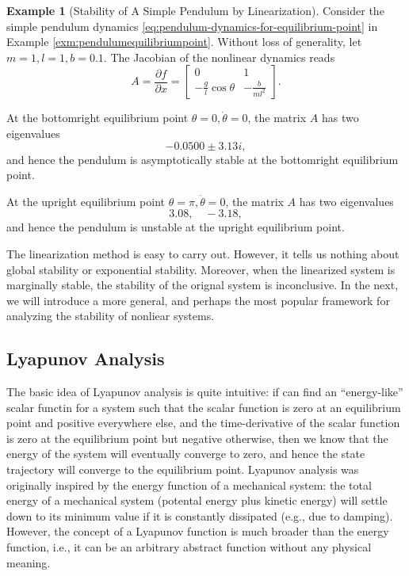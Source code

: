 \documentclass[
]{book}
\theoremstyle{definition}
\theoremstyle{definition}
\newtheorem{example}{Example}[chapter]
\theoremstyle{definition}
\theoremstyle{definition}
\theoremstyle{remark}
\begin{document}
\begin{example}[Stability of A Simple Pendulum by Linearization]
\protect\hypertarget{exm:pendulumstabilitybylinearization}{}\label{exm:pendulumstabilitybylinearization}Consider the simple pendulum dynamics \eqref{eq:pendulum-dynamics-for-equilibrium-point} in Example \ref{exm:pendulumequilibriumpoint}. Without loss of generality, let \(m=1,l=1,b=0.1\). The Jacobian of the nonlinear dynamics reads
\[
A = \frac{\partial f}{\partial x} = 
\begin{bmatrix}
0 & 1 \\
-\frac{g}{l} \cos \theta & -\frac{b}{ml^2}
\end{bmatrix}.
\]

At the bottomright equilibrium point \(\theta =0, \dot{\theta} = 0\), the matrix \(A\) has two eigenvalues
\[
-0.0500 \pm 3.13i,
\]
and hence the pendulum is asymptotically stable at the bottomright equilibrium point.

At the upright equilibrium point \(\theta =\pi, \dot{\theta} = 0\), the matrix \(A\) has two eigenvalues
\[
3.08, \quad -3.18,
\]
and hence the pendulum is unstable at the upright equilibrium point.
\end{example}

The linearization method is easy to carry out. However, it tells us nothing about global stability or exponential stability. Moreover, when the linearized system is marginally stable, the stability of the orignal system is inconclusive. In the next, we will introduce a more general, and perhaps the most popular framework for analyzing the stability of nonliear systems.

\hypertarget{lyapunov-analysis}{%
\subsection{Lyapunov Analysis}\label{lyapunov-analysis}}

The basic idea of Lyapunov analysis is quite intuitive: if can find an ``energy-like'' scalar functin for a system such that the scalar function is zero at an equilibrium point and positive everywhere else, and the time-derivative of the scalar function is zero at the equilibrium point but negative otherwise, then we know that the energy of the system will eventually converge to zero, and hence the state trajectory will converge to the equilibrium point. Lyapunov analysis was originally inspired by the energy function of a mechanical system: the total energy of a mechanical system (potental energy plus kinetic energy) will settle down to its minimum value if it is constantly dissipated (e.g., due to damping). However, the concept of a Lyapunov function is much broader than the energy function, i.e., it can be an arbitrary abstract function without any physical meaning.
\end{document}
